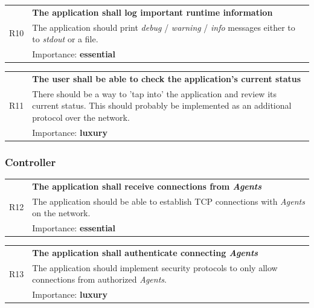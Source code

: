 \documentclass[12pt,a4paper,table]{article}
\begin{document}
                \vspace{0.5cm}
                \noindent
                \begin{tabular}{ p{0.7cm}|p{14.5cm} }
                    \multirow{3}{*}{R10} & \textbf{The application shall log important runtime information}\\
                    \cline{2-2}
                    & The application should print \textit{debug} / \textit{warning} / \textit{info} messages either to to \textit{stdout} or a file.\\
                    \cline{2-2}
                    & Importance: \textbf{essential}
                \end{tabular}

                \vspace{0.5cm}
                \noindent
                \begin{tabular}{ p{0.7cm}|p{14.5cm} }
                    \multirow{3}{*}{R11} & \textbf{The user shall be able to check the application's current status}\\
                    \cline{2-2}
                    & There should be a way to 'tap into' the application and review its current status. This should probably be implemented as an additional protocol over the network.\\
                    \cline{2-2}
                    & Importance: \textbf{luxury}
                \end{tabular}


            \subsubsection{Controller}
                \begin{tabular}{ p{0.7cm}|p{14.5cm} }
                    \multirow{3}{*}{R12} & \textbf{The application shall receive connections from \textit{Agents}}\\
                    \cline{2-2}
                    & The application should be able to establish TCP connections with \textit{Agents} on the network.\\
                    \cline{2-2}
                    & Importance: \textbf{essential}
                \end{tabular}

                \vspace{0.5cm}
                \noindent
                \begin{tabular}{ p{0.7cm}|p{14.5cm} }
                    \multirow{3}{*}{R13} & \textbf{The application shall authenticate connecting \textit{Agents}}\\
                    \cline{2-2}
                    & The application should implement security protocols to only allow connections from authorized \textit{Agents}.\\
                    \cline{2-2}
                    & Importance: \textbf{luxury}
                \end{tabular}
\end{document}
